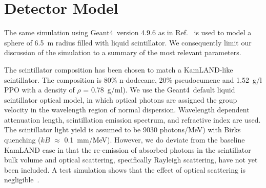 \section{Detector Model}
\label{sec:detector_description}

The same simulation using Geant4~version 4.9.6 as in Ref.~\cite{Aberle2014} is used to model a sphere of 6.5~m radius filled with
liquid scintillator. We consequently limit our discussion of the simulation to a summary of the most relevant parameters.  

The scintillator composition has been chosen to match a KamLAND-like scintillator\cite{kamland2003}. The composition is 80\% n-dodecane, 20\% pseudocumene and 1.52~g/l PPO with a density of $\rho$ = 0.78~g/ml).
We use the Geant4~default liquid scintillator optical model, in which optical photons are assigned the group velocity in the wavelength region of normal dispersion. Wavelength dependent attenuation length\cite{tajimaMaster}, scintillation emission spectrum\cite{tajimaMaster}, and refractive index\cite{OlegThesis} are used. The scintillator light yield is assumed to be 9030 photons/MeV) with Birks quenching  ($kB$ $\approx$ 0.1~mm/MeV)\cite{ChrisThesis}. However, we do deviate from the baseline KamLAND case in that the re-emission of absorbed photons in the scintillator bulk volume and optical scattering, specifically Rayleigh scattering, have not yet been included. A test simulation shows that the effect of optical scattering is negligible~\cite{Aberle2014}.


